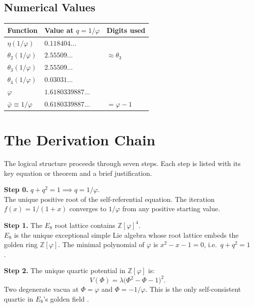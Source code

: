 \documentclass[11pt,a4paper]{article}
\newcommand{\vp}{\varphi}
\newcommand{\vpbar}{\bar{\varphi}}
\begin{document}
\subsection{Numerical Values}

\begin{center}
\begin{tabular}{lll}
\toprule
Function & Value at $q = 1/\vp$ & Digits used \\
\midrule
$\eta(1/\vp)$ & $0.118404\ldots$ & \\
$\theta_2(1/\vp)$ & $2.55509\ldots$ & $\approx \theta_3$ \\
$\theta_3(1/\vp)$ & $2.55509\ldots$ & \\
$\theta_4(1/\vp)$ & $0.03031\ldots$ & \\
$\vp$ & $1.6180339887\ldots$ & \\
$\vpbar \equiv 1/\vp$ & $0.6180339887\ldots$ & $= \vp - 1$ \\
\bottomrule
\end{tabular}
\end{center}

\section{The Derivation Chain}
\label{sec:chain}

The logical structure proceeds through seven steps.  Each step is listed with
its key equation or theorem and a brief justification.

\medskip
\noindent\textbf{Step 0.} \quad $q + q^2 = 1 \implies q = 1/\vp$.\\
The unique positive root of the self-referential equation.  The iteration
$f(x) = 1/(1+x)$ converges to $1/\vp$ from any positive starting value.

\medskip
\noindent\textbf{Step 1.} \quad The $E_8$ root lattice contains $\mathbb{Z}[\vp]^4$.\\
$E_8$ is the unique exceptional simple Lie algebra whose root lattice embeds the
golden ring $\mathbb{Z}[\vp]$.  The minimal polynomial of $\vp$ is
$x^2 - x - 1 = 0$, i.e.\ $q + q^2 = 1$.

\medskip
\noindent\textbf{Step 2.} \quad The unique quartic potential in $\mathbb{Z}[\vp]$ is:
\begin{equation}
  \boxed{V(\Phi) = \lambda\bigl(\Phi^2 - \Phi - 1\bigr)^2.}
\end{equation}
Two degenerate vacua at $\Phi = \vp$ and $\Phi = -1/\vp$.  This is the only
self-consistent quartic in $E_8$'s golden field
\cite{derive_V_from_E8}.
\end{document}

